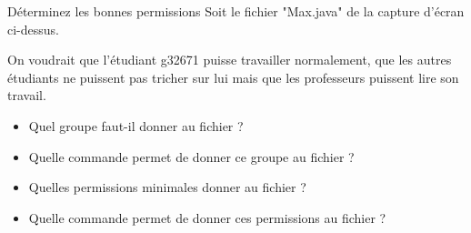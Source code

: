 \documentclass[a4paper,11pt]{style-esi/td}
\begin{document}
	
\begin{Exercice}{Déterminez les bonnes permissions}	
	Soit le fichier "Max.java" de la capture d'écran ci-dessus.
	
	On voudrait que l'étudiant g32671 puisse travailler  
	normalement, que les autres étudiants ne puissent pas tricher sur  
	lui mais que les professeurs puissent lire son travail.   
	
	\begin{itemize}
		
		\item 
		Quel groupe faut-il donner au fichier ?
		\par
		\textcolor{gray}{\underline{\hspace*{10em}}} 
		\item 
		Quelle commande permet de donner ce groupe au fichier ?
		\par
		\textcolor{gray}{\underline{\hspace*{3em}}}  \textcolor{gray}{\underline{\hspace*{10em}}}  \textcolor{gray}{\underline{\hspace*{10em}}} 
		\item 
		Quelles permissions minimales donner au fichier ?                
		\par
		\textcolor{gray}{\underline{\hspace*{1em}}}  \textcolor{gray}{\underline{\hspace*{1em}}}  \textcolor{gray}{\underline{\hspace*{1em}}}  \textcolor{gray}{\underline{\hspace*{1em}}}  \textcolor{gray}{\underline{\hspace*{1em}}}  \textcolor{gray}{\underline{\hspace*{1em}}}  \textcolor{gray}{\underline{\hspace*{1em}}}  \textcolor{gray}{\underline{\hspace*{1em}}}  \textcolor{gray}{\underline{\hspace*{1em}}} 
		\item 
		Quelle commande permet de donner ces permissions au fichier ?
		\par
		\textcolor{gray}{\underline{\hspace*{3em}}}  \textcolor{gray}{\underline{\hspace*{2em}}}  \textcolor{gray}{\underline{\hspace*{10em}}} 
	\end{itemize}
	
	
\end{Exercice}
\end{document}
